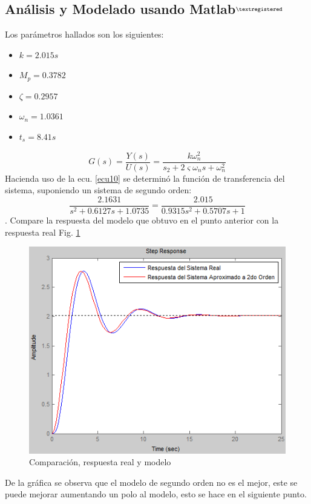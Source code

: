 \documentclass[twocolumn]{IEEEtran}
\begin{document}
\subsection{Análisis y Modelado usando Matlab$^{\textregistered}$}
\noindent
Los parámetros hallados son los siguientes:
\begin{itemize}
 \item $k= 2.015s$
 \item $M_p=0.3782$
 \item $\zeta=0.2957$
 \item $\omega_n=1.0361$
 \item $t_s=8.41s$
\end{itemize}
\begin{equation}
 G(s)=\frac{Y(s)}{U(s)}=\frac{{k\omega _n ^2 }}{{s_2  + 2\varsigma \omega _n s + \omega _n ^2 }}
\label{ecu10}
\end{equation}
\noindent
Hacienda uso de la ecu. \ref{ecu10} se determinó la función de transferencia del sistema, suponiendo un sistema de segundo orden:
$$\frac{{2.1631}}{{s^2  + 0.6127s + 1.0735}} = \frac{{2.015}}{{0.9315s^2  + 0.5707s + 1}}$$
. Compare la respuesta del modelo que obtuvo en el punto anterior con la respuesta real Fig. \ref{fig13}
\begin{figure}[]
	\centering
		\includegraphics[scale=0.5]{figure13.png}
	\caption{Comparación, respuesta real y modelo}
	\label{fig13}
\end{figure}
\noindent
De la gráfica se observa que el modelo de segundo orden no es el mejor, este se puede mejorar aumentando un polo al modelo, esto se hace en el siguiente punto.\\\\
\end{document}
